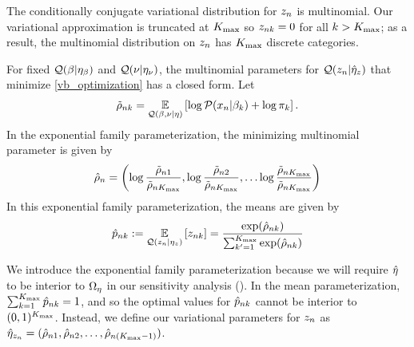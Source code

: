 


\begin{ex}
%
The conditionally conjugate variational distribution for $z_n$
is multinomial.
Our variational approximation is truncated at ${K_{\mathrm{max}}}$ so
$z_{nk} = 0$ for all $k > {K_{\mathrm{max}}}$;
as a result,
the multinomial distribution on $z_n$ has ${K_{\mathrm{max}}}$ discrete categories.

For fixed $\mathcal{Q}(\beta\vert\eta_{\beta})$ and $\mathcal{Q}(\nu\vert\eta_{\nu})$, the multinomial parameters for
$\mathcal{Q}(z_n \vert \hat\eta_{z})$ that minimize \eqref{vb_optimization} has a closed form.
Let
\begin{align*}
\tilde \rho_{nk} = \underset{\mathcal{Q}(\beta, \nu \vert \eta)}{\mathbb{E}}\left[\log \mathcal{P}(x_n \vert \beta_k) + \log \pi_k\right].
\end{align*}
%
In the exponential family parameterization, the minimizing multinomial parameter is given by
%
\begin{align*}
%
\hat\rho_\n = \left(\log\frac{\tilde\rho_{\n1}}{\tilde\rho_{\n\kmax}}, \log\frac{\tilde\rho_{\n2}}{\tilde\rho_{\n\kmax}}, \ldots
\log\frac{\tilde\rho_{\n\kmax}}{\tilde\rho_{\n\kmax}}\right)
%
\end{align*}
%
In this exponential family parameterization, the means are given by
\begin{align*}
  \hat p_{nk} := \underset{\mathcal{Q}(z_n \vert \eta_{z})}{\mathbb{E}}\left[z_{nk}\right] =
  \frac{\exp(\hat\rho_{nk})}{\sum_{k'=1}^{{K_{\mathrm{max}}}}\exp(\hat\rho_{nk})}
\end{align*}

We introduce the exponential family parameterization because
we will require $\hat\eta$ to be interior to $\Omega_{\eta}$ in our sensitivity analysis
().
In the mean parameterization,
$\sum_{k=1}^{K_{\mathrm{max}}} \hat p_{nk} = 1$, and so the
optimal values for $\hat p_{nk}$ cannot be
interior to $(0,1)^{K_{\mathrm{max}}}$.
Instead, we define our variational parameters for $z_n$
as $\hat\eta_{z_n} = (\hat\rho_{n1}, \hat\rho_{n2}, \ldots, \hat\rho_{n({K_{\mathrm{max}}} - 1)})$.

%
\end{ex}

